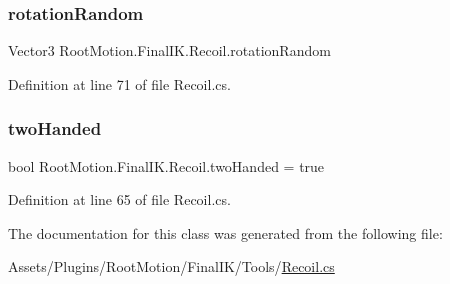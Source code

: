 \subsubsection{\texorpdfstring{rotation\+Random}{rotationRandom}}
{\footnotesize\ttfamily Vector3 Root\+Motion.\+Final\+I\+K.\+Recoil.\+rotation\+Random}



Definition at line 71 of file Recoil.\+cs.

\mbox{\label{class_root_motion_1_1_final_i_k_1_1_recoil_a99aebb1cf8d8f49f8d8657f2249cad1b}} 
\subsubsection{\texorpdfstring{two\+Handed}{twoHanded}}
{\footnotesize\ttfamily bool Root\+Motion.\+Final\+I\+K.\+Recoil.\+two\+Handed = true}



Definition at line 65 of file Recoil.\+cs.



The documentation for this class was generated from the following file\+:\begin{DoxyCompactItemize}
\item 
Assets/\+Plugins/\+Root\+Motion/\+Final\+I\+K/\+Tools/\mbox{\hyperlink{_recoil_8cs}{Recoil.\+cs}}\end{DoxyCompactItemize}
